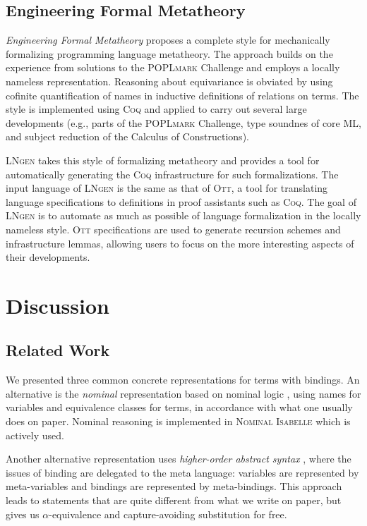 \documentclass[a4paper,11pt]{article}
\newcommand{\name}[1]{\textsc{#1}\xspace}
\def\Coq{\name{Coq}}
\def\POPLmark{\name{POPLmark}}
\def\LNgen{\name{LNgen}}
\def\Ott{\name{Ott}}
\def\ML{\name{ML}}
\def\NominalIsabelle{\name{Nominal Isabelle}}
\begin{document}
\subsection{Engineering Formal Metatheory}

\emph{Engineering Formal Metatheory} \cite{aydemir-et-al-08} proposes
a complete style for mechanically formalizing programming language
metatheory. The approach builds on the experience from solutions to
the \POPLmark Challenge and employs a locally nameless
representation. Reasoning about equivariance is obviated by using
cofinite quantification of names in inductive definitions of relations
on terms. The style is implemented using \Coq and applied to carry out
several large developments (e.g., parts of the \POPLmark Challenge,
type soundnes of core \ML, and subject reduction of the Calculus of
Constructions).

\LNgen \cite{aydemir-weirich-09} takes this style of formalizing
metatheory and provides a tool for automatically generating the
\Coq infrastructure for such formalizations. The input language of
\LNgen is the same as that of \Ott, a tool for translating language
specifications to definitions in proof assistants such as \Coq. The
goal of \LNgen is to automate as much as possible of language
formalization in the locally nameless style. \Ott specifications are
used to generate recursion schemes and infrastructure lemmas, allowing
users to focus on the more interesting aspects of their developments.


\section{Discussion}\label{sec:discussion}


\subsection{Related Work}

We presented three common concrete representations for terms with
bindings. An alternative is the {\em nominal} representation based on
nominal logic \cite{pitts-03}, using names for variables and
equivalence classes for terms, in accordance with what one usually
does on paper. Nominal reasoning is implemented in \NominalIsabelle
\cite{urban-08} which is actively used.

Another alternative representation uses {\em higher-order abstract
  syntax} \cite{capretta-felty-06},
where the issues of binding are delegated to the meta language:
variables are represented by meta-variables and bindings are
represented by meta-bindings. This approach leads to statements that
are quite different from what we write on paper, but gives us
$\alpha$-equivalence and capture-avoiding substitution for free.
\end{document}
